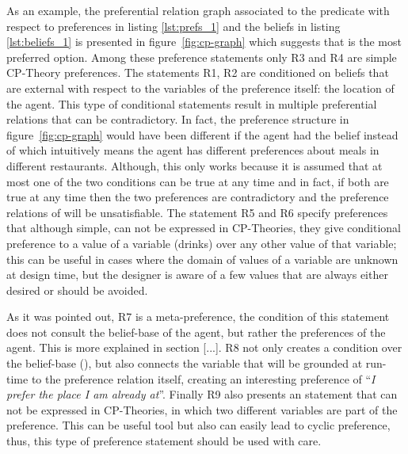 \documentclass[sigconf,anonymous]{aamas}
\begin{document}
As an example, the preferential relation graph associated to the predicate  with respect to preferences in listing \ref{lst:prefs_1} and the beliefs in listing \ref{lst:beliefs_1} is presented in figure~\ref{fig:cp-graph} which suggests that  is the most preferred option. Among these preference statements only R3 and R4 are simple CP-Theory preferences. The statements R1, R2 are conditioned on beliefs that are external with respect to the variables of the preference itself: the location of the agent. This type of conditional statements result in multiple preferential relations that can be contradictory. In fact, the preference structure in figure~\ref{fig:cp-graph} would have been different if the agent had the belief  instead of  which intuitively means the agent has different preferences about meals in different restaurants. Although, this only works because it is assumed that at most one of the two conditions  can be true at any time and in fact, if both are true at any time then the two preferences are contradictory and the preference relations of  will be unsatisfiable.
The statement R5 and R6 specify preferences that although simple, can not be expressed in CP-Theories, they give conditional preference to a value of a variable (drinks) over any other value of that variable; this can be useful in cases where the domain of values of a variable are unknown at design time, but the designer is aware of a few values that are always either desired or should be avoided. 



As it was pointed out, R7 is a meta-preference, the condition of this statement does not consult the belief-base of the agent, but rather the preferences of the agent. This is more explained in section [...]. R8 not only creates a condition over the belief-base (), but also connects the variable  that will be grounded at run-time to the preference relation itself, creating an interesting preference of ``\textit{I prefer the place I am already at}''. Finally R9 also presents an statement that can not be expressed in CP-Theories, in which two different variables are part of the preference. This can be useful tool but also can easily lead to cyclic preference, thus, this type of preference statement should be used with care.
\end{document}
